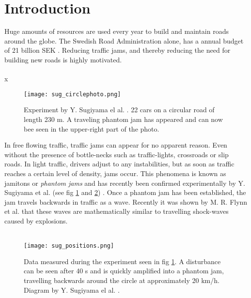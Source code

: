 \section{Introduction}

Huge amounts of resources are used every year to build and maintain roads
around the globe. The Swedish Road Administration alone, has a annual budget
of 21 billion SEK \cite{vagverket}. Reducing traffic jams, and thereby
reducing the need for building new roads is highly motivated.\\\\

x

\begin{figure}[H]
    \begin{center}
    \texttt{[image: sug\_circlephoto.png]}
    \caption{\label{sug_photo}
Experiment by Y. Sugiyama el al. \cite{sugiyama}. 22 cars on a circular road
of length 230 m. A traveling phantom jam has appeared and can now bee seen in
the upper-right part of the photo.
} \end{center} \end{figure}

In free flowing traffic, traffic jams can appear for no apparent reason. Even
without the presence of bottle-necks such as traffic-lights, crossroads or
slip roads. In light traffic, drivers adjust to any
instabilities, but as soon as traffic reaches a certain level of density, jams
occur. This phenomena is known as jamitons or \emph{phantom jams} and has
recently been confirmed experimentally by Y. Sugiyama et al. (see fig
\ref{sug_photo} and \ref{sug_positions}) \cite{sugiyama}. Once a phantom jam has been
established, the jam travels backwards in traffic as a wave. Recently it was
shown by M. R. Flynn et al. \cite{mit} that these waves are mathematically
similar to travelling shock-waves caused by explosions.\\\\

\begin{figure}[H]
    \begin{center}
    \texttt{[image: sug\_positions.png]}
    \caption{\label{sug_positions}
Data measured during the experiment seen in fig \ref{sug_photo}. A disturbance
can be seen after 40 s and is quickly amplified into a phantom jam, travelling
backwards around the circle at approximately 20 km/h.
Diagram by Y. Sugiyama el al. \cite{sugiyama}.}
\end{center} \end{figure}

